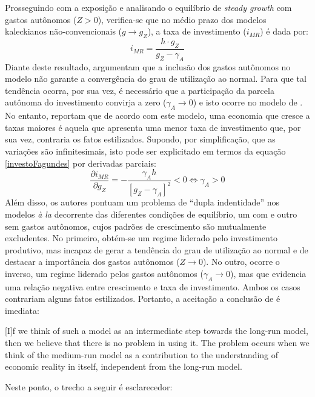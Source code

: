 Prosseguindo com a exposição e analisando o equilíbrio de \textit{steady growth} com gastos autônomos ($Z > 0$), verifica-se que no médio prazo dos modelos kaleckianos não-convencionais ($g\to g_Z$), a taxa de investimento ($i_{MR}$) é dada por:
\begin{equation}
\label{investoFagundes}
i_{MR} = \frac{h\cdot g_Z}{g_Z - \gamma_A}
\end{equation}
Diante deste resultado, \textcite{fagundes_role_2017} argumentam que a inclusão dos gastos autônomos no modelo não garante a convergência do grau de utilização ao normal. Para que tal tendência ocorra, por sua vez, é necessário que a participação da parcela autônoma do investimento convirja a zero ($\gamma_A \to 0$) e isto ocorre no modelo de \textcite{allain_tackling_2015}. 
No entanto, \textcite{fagundes_role_2017} reportam que de acordo com este modelo, uma economia que cresce a taxas maiores é aquela que apresenta uma menor taxa de investimento que, por sua vez, contraria os fatos estilizados. Supondo, por simplificação, que as variações são infinitesimais, isto pode ser explicitado em termos da equação \ref{investoFagundes} por derivadas parciais:
$$
\frac{\partial i_{MR}}{\partial g_Z} = - \frac{\gamma_A h}{[g_Z - \gamma_A]^2} < 0 \Leftrightarrow \gamma_A > 0
$$
Além disso, os autores pontuam um problema de ``dupla indentidade'' nos modelos \textit{à la} \textcite{allain_tackling_2015} decorrente das diferentes condições de equilíbrio, um com e outro sem gastos autônomos, cujos padrões de crescimento são mutualmente excludentes. No primeiro, obtém-se um regime liderado pelo investimento produtivo, mas incapaz de gerar a tendência do grau de utilização ao normal e de destacar a importância dos gastos autônomos ($Z\to 0$). No outro, ocorre o inverso, um regime liderado pelos gastos autônomos ($\gamma_A \to 0$), mas que evidencia uma relação negativa entre crescimento e taxa de investimento. Ambos os casos contrariam alguns fatos estilizados. Portanto, a aceitação a conclusão de \textcite[p.~13]{fagundes_role_2017} é imediata:

\begin{citacao}
	
	[I]f we think of such a model as an intermediate step towards the long-run model, then we
	believe that there is no problem in using it. The problem occurs when we think of the medium-run
	model as a contribution to the understanding of economic reality in itself, independent from the long-run model.
\end{citacao}
Neste ponto, o trecho a seguir é esclarecedor:

